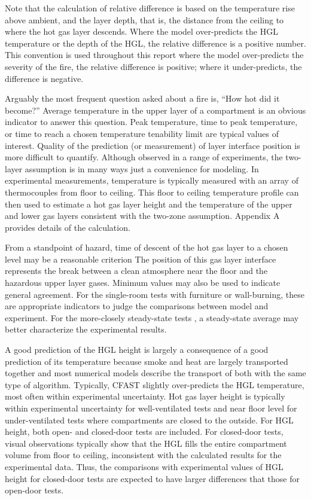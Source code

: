 Note that the calculation of relative difference is based on the temperature rise above ambient, and the layer depth, that is, the distance from the ceiling to where the hot gas layer descends.  Where the model over-predicts the HGL temperature or the depth of the HGL, the relative difference is a positive number. This convention is used throughout this report where the model over-predicts the severity of the fire, the relative difference is positive; where it under-predicts, the difference is negative.

Arguably the most frequent question asked about a fire is, ``How hot did it become?''  Average temperature in the upper layer of a compartment is an obvious indicator to answer this question.  Peak temperature, time to peak temperature, or time to reach a chosen temperature tenability limit are typical values of interest.  Quality of the prediction (or measurement) of layer interface position is more difficult to quantify.  Although observed in a range of experiments, the two-layer assumption is in many ways just a convenience for modeling.  In experimental measurements, temperature is typically measured with an array of thermocouples from floor to ceiling.  This floor to ceiling temperature profile can then used to estimate a hot gas layer height and the temperature of the upper and lower gas layers \cite{Janssens:1992} \cite{FDS_User_Guide_6} consistent with the two-zone assumption. Appendix A provides details of the calculation.

From a standpoint of hazard, time of descent of the hot gas layer to a chosen level may be a reasonable criterion The position of this gas layer interface represents the break between a clean atmosphere near the floor and the hazardous upper layer gases.  Minimum values may also be used to indicate general agreement.  For the single-room tests with furniture or wall-burning, these are appropriate indicators to judge the comparisons between model and experiment.  For the more-closely steady-state tests , a steady-state average may better characterize the experimental results.

A good prediction of the HGL height is largely a consequence of a good prediction of its temperature because smoke and heat are largely transported together and most numerical models describe the transport of both with the same type of algorithm.  Typically, CFAST slightly over-predicts the HGL temperature, most often within experimental uncertainty.  Hot gas layer height is typically within experimental uncertainty for well-ventilated tests and near floor level for under-ventilated tests where compartments are closed to the outside.  For HGL height, both open- and closed-door tests are included.  For closed-door tests, visual observations typically show that the HGL fills the entire compartment volume from floor to ceiling, inconsistent with the calculated results for the experimental data.  Thus, the comparisons with experimental values of HGL height for closed-door tests are expected to have larger differences that those for open-door tests.

